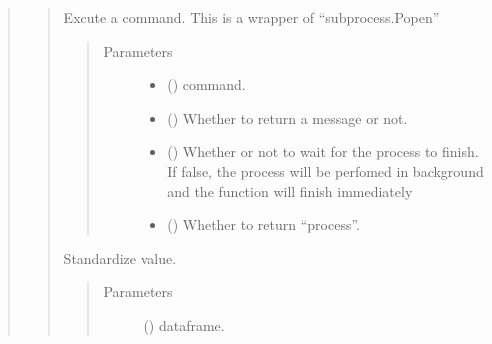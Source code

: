 \documentclass[letterpaper,10pt,english]{sphinxmanual}
\begin{document}
\begin{quote}
\begin{quote}
\begin{fulllineitems}
\label{\detokenize{modules/celloracle.utility:celloracle.utility.exec_process}}
Excute a command. This is a wrapper of “subprocess.Popen”
\begin{quote}\begin{description}
\item[{Parameters}] \leavevmode\begin{itemize}
\item {} 
 () \textendash{} command.

\item {} 
 () \textendash{} Whether to return a message or not.

\item {} 
 () \textendash{} Whether or not to wait for the process to finish. If false, the process will be perfomed in background and the function will finish immediately

\item {} 
 () \textendash{} Whether to return “process”.

\end{itemize}

\end{description}\end{quote}

\end{fulllineitems}


\begin{fulllineitems}
\label{\detokenize{modules/celloracle.utility:celloracle.utility.standard}}
Standardize value.
\begin{quote}\begin{description}
\item[{Parameters}] \leavevmode
{} () \textendash{} dataframe.


\end{description}
\end{quote}
\end{fulllineitems}
\end{quote}
\end{quote}
\end{document}
